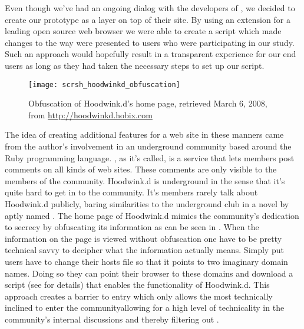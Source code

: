 Even though we've had an ongoing dialog with the developers of \urort{}, we
decided to create our prototype as a layer on top of their site.
By using an
extension
for a leading open source%
web browser we were able to create a script which
made changes to the way \urort{}
were presented to users who were participating in our study.
Such an approach would hopefully result in a transparent experience for our
end users as long as they had taken the necessary steps to set up 
our script.

\begin{figure}
  \texttt{[image: scrsh\_hoodwinkd\_obfuscation]}
  \caption[Hoodwink.d Obfuscation]{
    Obfuscation of Hoodwink.d's home page,
    retrieved March 6, 2008, from
    \url{http://hoodwinkd.hobix.com}
  }
  \label{figure:scrsh.hoodwinkd.obfuscation}
\end{figure}

The idea of creating additional features for a web site in these manners
came from the author's involvement in an underground community based around
the Ruby programming language. ,%
as it's called, is a service that lets members post comments on all kinds of
web sites. These comments are only visible to the members of the
community.
Hoodwink.d is underground in the sense that it's quite hard to get in to
the community. It's members rarely talk about Hoodwink.d publicly, baring
similarities to the underground club in a novel by \citet{palahniuk96}
aptly named .%
The home page of Hoodwink.d mimics the community's dedication to secrecy
by obfuscating its information as can be seen in
.
When the information on the page is viewed without obfuscation%
one have to be pretty technical savvy to decipher what the information 
actually means. Simply put users have to change their hosts file
so that it points to two imaginary domain names. Doing so they can point their
browser to these domains and download a script (see
 for details)
that enables the functionality
of Hoodwink.d.%
This approach creates a barrier to entry which only allows the most
technically inclined to enter the community\dash{}allowing for a
high level of technicality in the community's internal discussions
and thereby filtering out .

